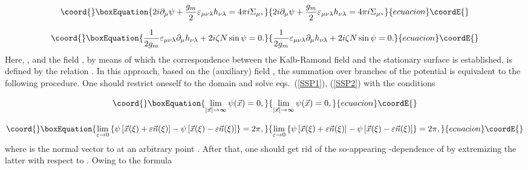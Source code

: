 \documentclass[a4paper,12pt]{article}
\begin{document}
\begin{equation}\coord{}\boxEquation{
\label{SSP1}
2i\partial_\mu\psi+\frac{g_m}{2}\varepsilon_{\mu\nu\lambda}h_{\nu\lambda}=4\pi i\Sigma_\mu,
}{
2i\partial_\mu\psi+\frac{g_m}{2}\varepsilon_{\mu\nu\lambda}h_{\nu\lambda}=4\pi i\Sigma_\mu,
}{ecuacion}\coordE{}\end{equation}

\begin{equation}\coord{}\boxEquation{
\label{SSP2}
\frac{1}{2g_m}\varepsilon_{\mu\nu\lambda}\partial_\mu h_{\nu\lambda}+2i\zeta N\sin\psi=0.
}{
\frac{1}{2g_m}\varepsilon_{\mu\nu\lambda}\partial_\mu h_{\nu\lambda}+2i\zeta N\sin\psi=0.
}{ecuacion}\coordE{}\end{equation}
Here, \coordHE{},
and the field \myHighlight{$\psi$}\coordHE{}, by means of which the correspondence between the Kalb-Ramond field and the stationary surface is established,
is defined by the relation \coordHE{}. In this approach, based on the (auxiliary) field \myHighlight{$\psi$}\coordHE{},
the summation over branches of the potential \coordHE{} is equivalent to the following procedure.
One should restrict oneself to the domain \myHighlight{$|\psi|\le\pi$}\coordHE{} and solve eqs.~(\ref{SSP1}), (\ref{SSP2}) with the conditions

\begin{equation}\coord{}\boxEquation{
\label{cond1}
\lim\limits_{|\vec x|\to\infty}^{}\psi(\vec x)=0,
}{
\lim\limits_{|\vec x|\to\infty}^{}\psi(\vec x)=0,
}{ecuacion}\coordE{}\end{equation}

\begin{equation}\coord{}\boxEquation{
\label{cond2}
\lim\limits_{\varepsilon\to 0}^{}\left\{\psi\left[\vec x(\xi)+\varepsilon\vec n(\xi)\right]-
\psi\left[\vec x(\xi)-\varepsilon\vec n(\xi)\right]\right\}=2\pi,
}{
\lim\limits_{\varepsilon\to 0}^{}\left\{\psi\left[\vec x(\xi)+\varepsilon\vec n(\xi)\right]-
\psi\left[\vec x(\xi)-\varepsilon\vec n(\xi)\right]\right\}=2\pi,
}{ecuacion}\coordE{}\end{equation}
where \coordHE{} is the normal vector to \myHighlight{$\Sigma$}\coordHE{} at an arbitrary point \coordHE{}. After that, one should
get rid of the so-appearing \myHighlight{$\Sigma$}\coordHE{}-dependence of \coordHE{} by extremizing the latter with respect to \coordHE{}.
Owing to the formula
\end{document}
